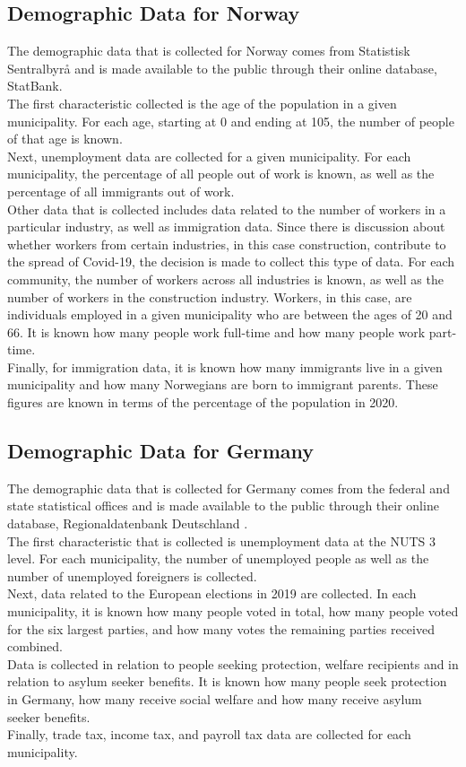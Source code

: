 \subsection{Demographic Data for Norway}
The demographic data that is collected for Norway comes from Statistisk Sentralbyrå and is made available to the public through their online database, StatBank\autocite[][]{ssb}. \\
The first characteristic collected is the age of the population in a given municipality. For each age, starting at 0 and ending at 105, the number of people of that age is known. \\
Next, unemployment data are collected for a given municipality. For each municipality, the percentage of all people out of work is known, as well as the percentage of all immigrants out of work. \\
Other data that is collected includes data related to the number of workers in a particular industry, as well as immigration data. Since there is discussion about whether workers from certain industries, in this case construction, contribute to the spread of Covid-19, the decision is made to collect this type of data. For each community, the number of workers across all industries is known, as well as the number of workers in the construction industry. Workers, in this case, are individuals employed in a given municipality who are between the ages of 20 and 66. It is known how many people work full-time and how many people work part-time. \\
Finally, for immigration data, it is known how many immigrants live in a given municipality and how many Norwegians are born to immigrant parents. These figures are known in terms of the percentage of the population in 2020.
\subsection{Demographic Data for Germany}
The demographic data that is collected for Germany comes from the federal and state statistical offices and is made available to the public through their online database, Regionaldatenbank Deutschland \autocite[][]{rdb}. \\
The first characteristic that is collected is unemployment data at the NUTS 3 level. For each municipality, the number of unemployed people as well as the number of unemployed foreigners is collected. \\
Next, data related to the European elections in 2019 are collected. In each municipality, it is known how many people voted in total, how many people voted for the six largest parties, and how many votes the remaining parties received combined. \\
Data is collected in relation to people seeking protection, welfare recipients and in relation to asylum seeker benefits. It is known how many people seek protection in Germany, how many receive social welfare and how many receive asylum seeker benefits. \\
Finally, trade tax, income tax, and payroll tax data are collected for each municipality. 
\clearpage
